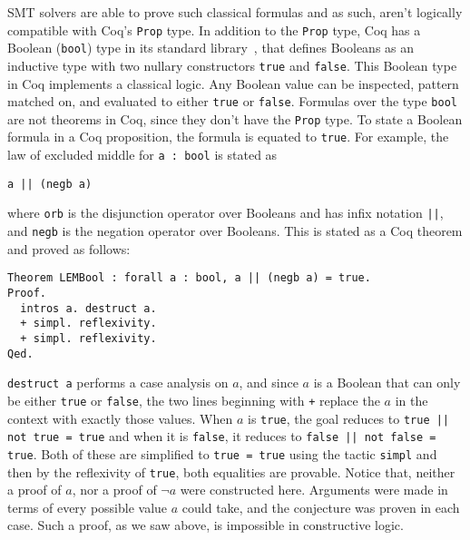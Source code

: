 \documentclass{article}
\begin{document}
	SMT solvers are able to prove 
	such classical formulas and as
	such, aren't logically compatible
	with Coq's \texttt{Prop} type. 
	In addition to the \texttt{Prop} 
	type, Coq has a Boolean 
	(\texttt{bool}) type in its standard 
	library~\cite{CoqBool}, that defines 
	Booleans as an 
	inductive type with two nullary
	constructors \texttt{true} and
	\texttt{false}. This Boolean type 
	in Coq implements a classical 
	logic. Any Boolean value can 
	be inspected, pattern matched on,
	and evaluated to either 
	\texttt{true} or \texttt{false}.
	Formulas over the type 
	\texttt{bool} are not theorems
	in Coq, since they don't have 
	the \texttt{Prop} type. To 
	state a Boolean formula in a 
	Coq proposition, the formula is 
	equated to \texttt{true}. 
	For example, the law of 
	excluded middle for 
	\texttt{a : bool} is stated as 
	\begin{center}
		\texttt{a || (negb a)}
	\end{center}
	where \texttt{orb} is the 
	disjunction operator over 
	Booleans and has 
	infix notation \texttt{||},
	and \texttt{negb} is the 
	negation operator over 
	Booleans.
	This is stated as a Coq theorem 
	and proved as follows:
	\begin{verbatim}
Theorem LEMBool : forall a : bool, a || (negb a) = true.
Proof.
  intros a. destruct a.
  + simpl. reflexivity.
  + simpl. reflexivity.
Qed.
	\end{verbatim}
	\texttt{destruct a} performs a 
	case analysis on $a$, and since $a$ 
	is a Boolean that can 
	only be either \texttt{true}
	or \texttt{false}, the two lines
	beginning with \texttt{+} 
	replace the $a$ in the context
	with exactly those values.
	When $a$ is \texttt{true}, the 
	goal reduces to 
	\texttt{true || not true = true}
	and when it is \texttt{false}, it
	reduces to 
	\texttt{false || not false = true}.
	Both of these are simplified to 
	\texttt{true = true} using the 
	tactic \texttt{simpl} and then 
	by the reflexivity of 
	\texttt{true}, both equalities
	are provable. Notice that, 
	neither a proof of $a$, nor 
	a proof of $\neg a$ were 
	constructed here. Arguments were
	made in terms of every possible 
	value $a$ could take, and the
	conjecture was proven in 
	each case. Such a proof, as we 
	saw above, is impossible in 
	constructive logic.
	
\end{document}
